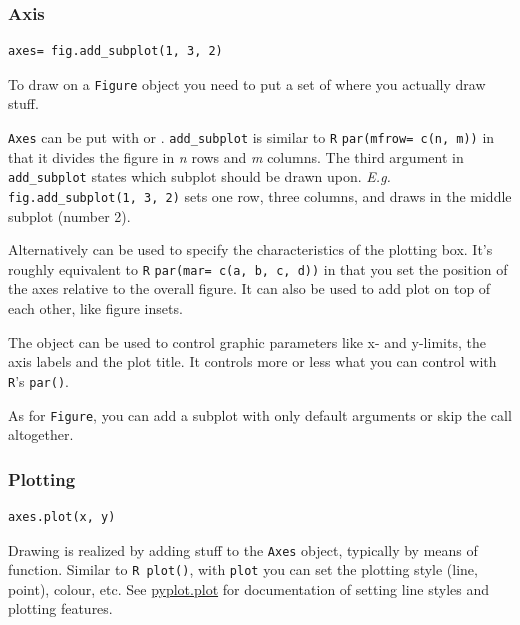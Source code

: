 \subsubsection{Axis}

\begin{verbatim}
axes= fig.add_subplot(1, 3, 2)
\end{verbatim}

To draw on a \texttt{Figure} object you need to put a set of  where you actually
draw stuff.

\texttt{Axes} can be put with  or . \texttt{add\_subplot}
is similar to \texttt{R} \texttt{par(mfrow= c(n, m))} in that it divides the figure
in \emph{n} rows and \emph{m} columns. The third argument in \texttt{add\_subplot} states
which subplot should be drawn upon. \emph{E.g.} \texttt{fig.add\_subplot(1, 3, 2)}
sets one row, three columns, and draws in the middle subplot (number 2).

Alternatively  can be used to specify the characteristics of the
plotting box. It's roughly equivalent to \texttt{R} \texttt{par(mar= c(a, b, c, d))}
in that you set the position of the axes relative to the overall figure. It can also
be used to add plot on top of each other, like figure insets.

The  object can be used to control graphic parameters like x- and y-limits,
the axis labels and the plot title. It controls more or less what you can control with \texttt{R}'s \texttt{par()}.

As for \texttt{Figure}, you can add a subplot with only default arguments or skip
the call altogether.

\subsubsection{Plotting}

\begin{verbatim}
axes.plot(x, y)
\end{verbatim}

Drawing is realized by adding stuff to the \texttt{Axes} object, typically by means
of  function. Similar to \texttt{R plot()}, with \texttt{plot} you can
set the plotting style (line, point), colour, etc. See \href{http://matplotlib.org/api/pyplot_api.html#matplotlib.pyplot.plot}
{pyplot.plot} for documentation of setting line styles and plotting features.

